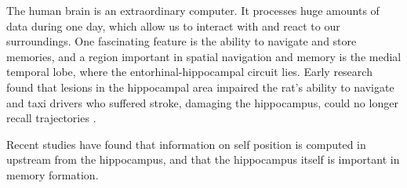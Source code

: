 



The human brain is an extraordinary computer. It processes huge amounts of data during one day, which allow us to interact with and react to our surroundings. %
One fascinating feature is the ability to navigate and store memories, and a region important in spatial navigation and memory is the medial temporal lobe, where the entorhinal-hippocampal circuit lies. Early research found that lesions in the hippocampal area impaired the rat's ability to navigate %
and taxi drivers who suffered stroke, damaging the hippocampus, could no longer recall trajectories \cite{maguire:2000:navigation}.

Recent studies have found that information on self position is computed in upstream from the hippocampus, and that the hippocampus itself is important in memory formation.

